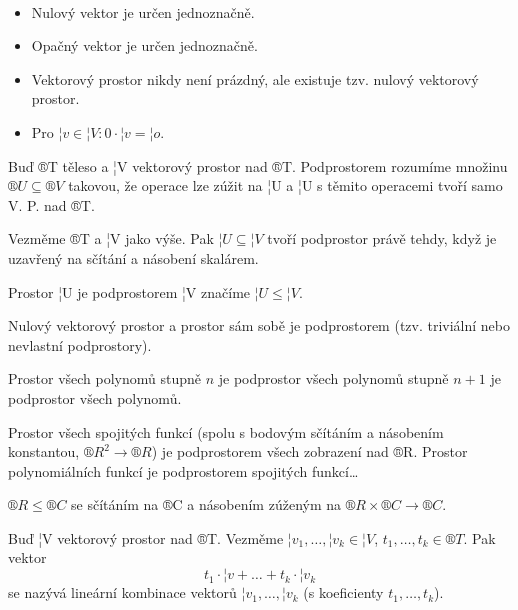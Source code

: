 \documentclass[12pt]{article}					%
\begin{document}
        \begin{tvrzeni}
            \ 
            \begin{itemize}
                \item Nulový vektor je určen jednoznačně.
                \item Opačný vektor je určen jednoznačně.
                \item Vektorový prostor nikdy není prázdný, ale existuje tzv. nulový vektorový prostor.
                \item Pro $¦v \in ¦V: 0·¦v = ¦o$.
            \end{itemize}
        \end{tvrzeni}

        \begin{definice}
            Buď ®T těleso a ¦V vektorový prostor nad ®T. Podprostorem rozumíme množinu $®U \subseteq ®V$ takovou, že operace lze zúžit na ¦U a ¦U s těmito operacemi tvoří samo V. P. nad ®T.
        \end{definice}

        \begin{tvrzeni}[T5.12]
            Vezměme ®T a ¦V jako výše. Pak $¦U \subseteq ¦V$ tvoří podprostor právě tehdy, když je uzavřený na sčítání a násobení skalárem.
        \end{tvrzeni}

        \begin{poznamka}
            Prostor ¦U je podprostorem ¦V značíme $¦U ≤ ¦V$.

            Nulový vektorový prostor a prostor sám sobě je podprostorem (tzv. triviální nebo nevlastní podprostory).
        \end{poznamka}


        \begin{priklady}
            Prostor všech polynomů stupně $n$ je podprostor všech polynomů stupně $n+1$ je podprostor všech polynomů.

            Prostor všech spojitých funkcí (spolu s bodovým sčítáním a násobením konstantou, $®R^2 \rightarrow ®R$) je podprostorem všech zobrazení nad ®R. Prostor polynomiálních funkcí je podprostorem spojitých funkcí…

            $®R ≤ ®C$ se sčítáním na ®C a násobením zúženým na $®R\times ®C \rightarrow ®C$.
        \end{priklady}

        \begin{definice}
            Buď ¦V vektorový prostor nad ®T. Vezměme $¦v_1, …, ¦v_k \in ¦V$, $t_1, …, t_k \in ®T$. Pak vektor
            $$ t_1·¦v + … + t_k·¦v_k $$ 
            se nazývá lineární kombinace vektorů $¦v_1, …, ¦v_k$ (s koeficienty $t_1, …, t_k$).
        \end{definice}
\end{document}
